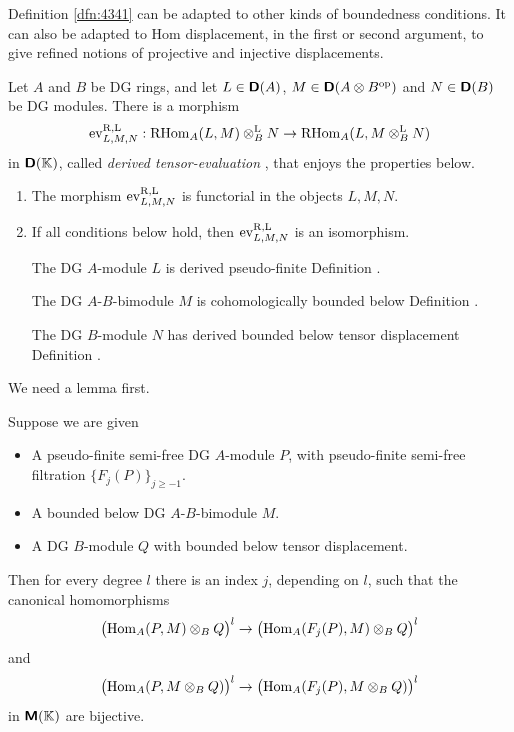 \begin{rem} \label{rem:4602}
Definition \ref{dfn:4341} can be adapted to other kinds of boundedness 
conditions. It can also be adapted to Hom displacement, in the first or second 
argument, to give refined notions of projective and injective displacements.
\end{rem}
 
\begin{thm} \label{thm:4320}
Let $A$ and $B$ be DG rings, and let $L \in \boldsymbol{\mathsf{D}}(A)$, 
$M \in \boldsymbol{\mathsf{D}}(A \otimes B^{\mathrm{op}})$ and $N \in \boldsymbol{\mathsf{D}}(B)$
be DG modules. There is a morphism 
\[ \operatorname{ev}^{\mathrm{R, L}}_{L, M, N} : \operatorname{RHom}_{A}(L, M) \otimes^{\mathrm{L}}_{B} N 
\to \operatorname{RHom}_{A}(L, M \otimes^{\mathrm{L}}_{B} N) \]
in $\boldsymbol{\mathsf{D}}(\mathbb{K})$, called {\em derived tensor-evaluation}%
,
that enjoys the properties below. 
\begin{enumerate}
\item The morphism $\operatorname{ev}^{\mathrm{R, L}}_{L, M, N}$ is functorial in the 
objects $L, M, N$.

\item If all conditions  below hold, then 
$\operatorname{ev}^{\mathrm{R, L}}_{L, M, N}$ is an isomorphism. 
\begin{enumerate}
 The DG $A$-module $L$ is derived pseudo-finite 
\tup{(}Definition \tup{\ref{dfn:4470})}.

 The DG $A$-$B$-bimodule $M$ is cohomologically bounded below
\tup{(}Definition .

 The DG $B$-module $N$ has derived bounded below tensor 
displacement \tup{(}Definition .
\end{enumerate}
\end{enumerate}
\end{thm}

We need a lemma first. 

\begin{lem} \label{lem:4735}
Suppose we are given\tup{:}
\begin{itemize}
\item A pseudo-finite semi-free DG $A$-module $P$, with pseudo-finite 
semi-free filtration $\{ F_j(P) \}_{j \geq -1}$.

\item A bounded below DG $A$-$B$-bimodule $M$.

\item A DG $B$-module $Q$ with bounded below tensor displacement.
\end{itemize}
Then for every degree $l$ there is an index $j$, depending on $l$, such that 
the canonical homomorphisms  
\[ \bigl( \operatorname{Hom}_{A}(P, M) \otimes_{B} Q \bigr)^l \to
\bigl( \operatorname{Hom}_{A}(F_{j}(P), M) \otimes_{B} Q \bigr)^l \]
and 
\[ \bigl( \operatorname{Hom}_{A}(P, M \otimes_{B} Q) \bigr)^l \to
\bigl( \operatorname{Hom}_{A}(F_{j}(P), M \otimes_{B} Q) \bigr)^l  \]
in $\boldsymbol{\mathsf{M}}(\mathbb{K})$ are bijective. 
\end{lem}

